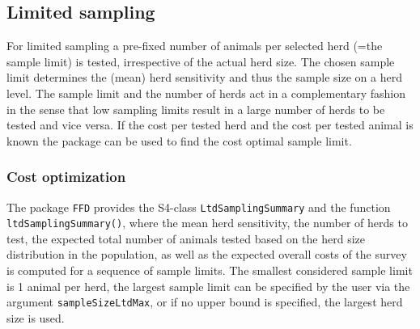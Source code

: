 \documentclass[nojss]{jss}
\begin{document}

\subsection{Limited sampling} \label{subsec:ltd-sampling}

For limited sampling a pre-fixed number of animals per selected herd (=the sample limit) is tested, irrespective of the actual herd size. The chosen sample limit determines the (mean) herd sensitivity and thus the sample size on a herd level. The sample limit and the number of herds act in a complementary fashion in the sense that low sampling limits result in a large number of herds to be tested and vice versa. If the cost per tested herd and the cost per tested animal is known the package can be used to find the cost optimal sample limit.

\subsubsection{Cost optimization}

The package \texttt{FFD} provides the S4-class \texttt{LtdSamplingSummary}   and the function \texttt{ltdSamplingSummary()},  where the mean herd sensitivity, the number of herds to test, the expected total number of animals tested based on the herd size distribution in the population, as well as the expected overall costs of the survey is computed for a sequence of sample limits. The smallest considered sample limit is 1 animal per herd, the largest sample limit can be specified by the user via the argument \texttt{sampleSizeLtdMax}, or if no upper bound is specified, the largest herd size is used.
\end{document}
